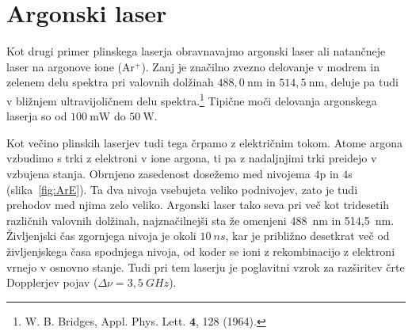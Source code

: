 \section{Argonski laser}
Kot drugi primer plinskega laserja obravnavajmo argonski laser ali natančneje
laser na argonove ione (Ar$^+$). Zanj je značilno zvezno 
delovanje v modrem in zelenem delu spektra pri 
valovnih dolžinah $488,0~\si{\nano\metre}$ in $514,5~\si{\nano\metre}$, deluje 
pa tudi v bližnjem ultravijoličnem delu spektra.\footnote{W. B. Bridges,
Appl. Phys. Lett. $\mathbf{4}$, 128 (1964).} Tipične moči delovanja argonskega laserja
so od $100~\si{\milli\watt}$ do $50~\si{\watt}$.

Kot večino plinskih laserjev tudi tega črpamo z električnim tokom.
Atome argona vzbudimo s trki z elektroni v ione argona, ti pa z nadaljnjimi
trki preidejo v vzbujena stanja. Obrnjeno zasedenost
dosežemo med nivojema $4$p in $4$s (slika~\ref{fig:ArE}). 
Ta dva nivoja vsebujeta veliko podnivojev, zato je tudi prehodov med
njima zelo veliko. Argonski laser tako seva pri več kot tridesetih različnih
valovnih dolžinah, najznačilnejši sta že omenjeni 488~nm in 514,5~nm. 
Življenjski čas zgornjega nivoja je okoli $10~\si{ns}$, kar je približno 
desetkrat več od življenjskega časa spodnjega nivoja, od koder se ioni
z rekombinacijo z elektroni vrnejo v osnovno stanje. Tudi pri tem laserju
je poglavitni vzrok za razširitev črte Dopplerjev 
pojav ($\Delta \nu = 3,5~\si{GHz}$).


